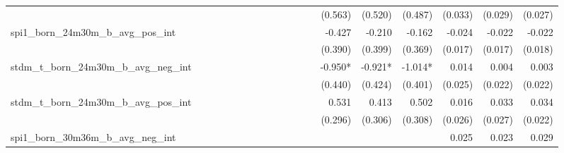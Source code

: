 \begin{tabular}{lrrrrrrrrrrrrrrrrrr}
                                            &              &              &              &              &              &              &              &              &               &              &              &               &      (0.563) &      (0.520) &       (0.487) &      (0.033) &      (0.029) &       (0.027) \\ 
spi1\_born\_24m30m\_b\_avg\_pos\_int        &              &              &              &              &              &              &              &              &               &              &              &               &       -0.427 &       -0.210 &        -0.162 &       -0.024 &       -0.022 &        -0.022 \\ 
                                            &              &              &              &              &              &              &              &              &               &              &              &               &      (0.390) &      (0.399) &       (0.369) &      (0.017) &      (0.017) &       (0.018) \\ 
stdm\_t\_born\_24m30m\_b\_avg\_neg\_int     &              &              &              &              &              &              &              &              &               &              &              &               &      -0.950* &      -0.921* &       -1.014* &        0.014 &        0.004 &         0.003 \\ 
                                            &              &              &              &              &              &              &              &              &               &              &              &               &      (0.440) &      (0.424) &       (0.401) &      (0.025) &      (0.022) &       (0.022) \\ 
stdm\_t\_born\_24m30m\_b\_avg\_pos\_int     &              &              &              &              &              &              &              &              &               &              &              &               &        0.531 &        0.413 &         0.502 &        0.016 &        0.033 &         0.034 \\ 
                                            &              &              &              &              &              &              &              &              &               &              &              &               &      (0.296) &      (0.306) &       (0.308) &      (0.026) &      (0.027) &       (0.022) \\ 
spi1\_born\_30m36m\_b\_avg\_neg\_int        &              &              &              &              &              &              &              &              &               &              &              &               &              &              &               &        0.025 &        0.023 &         0.029 \\ 

\end{tabular}
